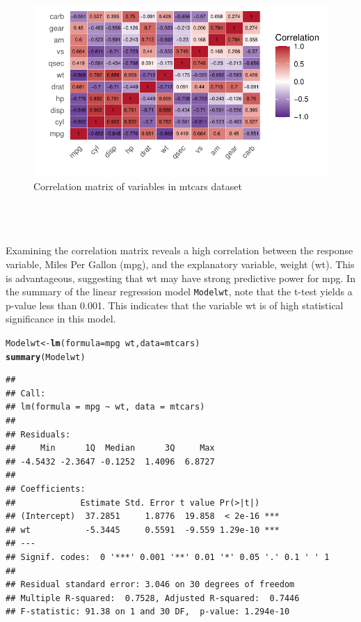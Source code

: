 \documentclass{article}\usepackage[]{graphicx}\usepackage[]{xcolor}
\makeatletter
\def\maxwidth{ %
  \ifdim\Gin@nat@width>\linewidth
    \linewidth
  \else
    \Gin@nat@width
  \fi
}
\newcommand{\hlopt}[1]{\textcolor[rgb]{0,0,0}{#1}}%
\newcommand{\hlstd}[1]{\textcolor[rgb]{0.345,0.345,0.345}{#1}}%
\newcommand{\hlkwb}[1]{\textcolor[rgb]{0.69,0.353,0.396}{#1}}%
\newcommand{\hlkwc}[1]{\textcolor[rgb]{0.333,0.667,0.333}{#1}}%
\newcommand{\hlkwd}[1]{\textcolor[rgb]{0.737,0.353,0.396}{\textbf{#1}}}%
\newenvironment{kframe}{%
 \def\at@end@of@kframe{}%
 \ifinner\ifhmode%
  \def\at@end@of@kframe{\end{minipage}}%
  \begin{minipage}{\columnwidth}%
 \fi\fi%
 \def\FrameCommand##1{\hskip\@totalleftmargin \hskip-\fboxsep
 \colorbox{shadecolor}{##1}\hskip-\fboxsep
     \hskip-\linewidth \hskip-\@totalleftmargin \hskip\columnwidth}%
 \MakeFramed {\advance\hsize-\width
   \@totalleftmargin\z@ \linewidth\hsize
   \@setminipage}}%
 {\par\unskip\endMakeFramed%
 \at@end@of@kframe}
\newenvironment{knitrout}{}{} %
\makeatother
\begin{document}
\begin{knitrout}\scriptsize
{}\color{fgcolor}\begin{figure}[H]

{\centering \includegraphics[width=\maxwidth]{figure/beamer-cor-matrix-mtcars2-1} 

}

\caption[Correlation matrix of variables in mtcars dataset]{Correlation matrix of variables in mtcars dataset}\label{fig:cor-matrix-mtcars2}
\end{figure}

\end{knitrout}
\\  
\\   
\\Examining the correlation matrix reveals a high correlation between the response variable, Miles Per Gallon (mpg), and the explanatory variable, weight (wt). This is advantageous, suggesting that wt may have strong predictive power for mpg. In the summary of the linear regression model \texttt{Modelwt}, note that the t-test yields a p-value less than 0.001. This indicates that the variable wt is of high statistical significance in this model.
\begin{knitrout}\scriptsize
{}\color{fgcolor}\begin{kframe}
\begin{alltt}
\hlstd{Modelwt} \hlkwb{<-} \hlkwd{lm}\hlstd{(}\hlkwc{formula} \hlstd{= mpg} \hlopt{~} \hlstd{wt,} \hlkwc{data} \hlstd{= mtcars)}
\hlkwd{summary}\hlstd{(Modelwt)}
\end{alltt}
\begin{verbatim}
## 
## Call:
## lm(formula = mpg ~ wt, data = mtcars)
## 
## Residuals:
##     Min      1Q  Median      3Q     Max 
## -4.5432 -2.3647 -0.1252  1.4096  6.8727 
## 
## Coefficients:
##             Estimate Std. Error t value Pr(>|t|)    
## (Intercept)  37.2851     1.8776  19.858  < 2e-16 ***
## wt           -5.3445     0.5591  -9.559 1.29e-10 ***
## ---
## Signif. codes:  0 '***' 0.001 '**' 0.01 '*' 0.05 '.' 0.1 ' ' 1
## 
## Residual standard error: 3.046 on 30 degrees of freedom
## Multiple R-squared:  0.7528,	Adjusted R-squared:  0.7446 
## F-statistic: 91.38 on 1 and 30 DF,  p-value: 1.294e-10
\end{verbatim}
\end{kframe}
\end{knitrout}
\end{document}
